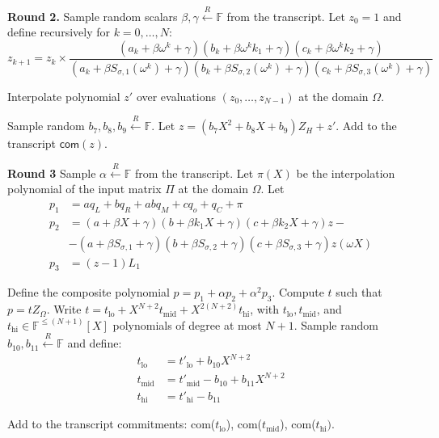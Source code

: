 \documentclass[../lecture-notes.tex]{subfiles}
\begin{document}
\textcolor{green!60!black}{\textbf{Round 2.}}  Sample random scalars $\beta,
\gamma \xleftarrow{R} \mathbb{F}$ from the transcript. Let $z_0 = 1$ and define
recursively for $k = 0, \dots, N$:
\begin{equation*}
    z_{k+1} = z_k \times \frac{(a_k + \beta \omega^{k} + \gamma) (b_k + \beta \omega^{k}k_1 + \gamma) (c_k + \beta \omega^{k}k_2 + \gamma)}{(a_k + \beta S_{\sigma,1}(\omega^{k}) + \gamma) (b_k + \beta S_{\sigma,2}(\omega^{k}) + \gamma) (c_k + \beta S_{\sigma,3}(\omega^{k}) + \gamma)}     
\end{equation*}

Interpolate polynomial $z'$ over evaluations $(z_0, \dots, z_{N-1})$ at the domain $\Omega$.

Sample random $b_7, b_8, b_9 \xleftarrow{R} \mathbb{F}$. Let $z = (b_7 X^2 + b_8
X + b_9)Z_H + z'$. Add to the transcript $\mathsf{com}(z)$.

\textcolor{green!60!black}{\textbf{Round 3}} Sample $\alpha \xleftarrow{R}
\mathbb{F}$ from the transcript. Let $\pi(X)$ be the interpolation polynomial of the
input matrix $\Pi$ at the domain $\Omega$. Let
\begin{align*}
p_1 &= aq_L + bq_R + abq_M + cq_o + q_C + \pi \\
p_2 &= (a + \beta X + \gamma)(b + \beta k_1 X + \gamma)(c + \beta k_2 X + \gamma)z - \\
    &- (a + \beta S_{\sigma,1} + \gamma)(b + \beta S_{\sigma,2} + \gamma)(c + \beta S_{\sigma,3} + \gamma)z(\omega X) \\
p_3 &= (z - 1)L_1
\end{align*}

Define the composite polynomial $p = p_1 + \alpha p_2 + \alpha^2 p_3$. Compute
$t$ such that $p = tZ_{\Omega}$. Write $t = t_{\text{lo}} +
X^{N+2}t_{\text{mid}} + X^{2(N+2)}t_{\text{hi}}$, with $t_{\text{lo}},
t_{\text{mid}}$, and $t_{\text{hi}} \in \mathbb{F}^{\leq (N+1)}[X]$ polynomials
of degree at most $N+1$. Sample random $b_{10}, b_{11} \xleftarrow{R} \mathbb{F}$ and define:
\begin{align*}
t_{\text{lo}} &= t'_{\text{lo}} + b_{10}X^{N+2} \\
t_{\text{mid}} &= t'_{\text{mid}} - b_{10} + b_{11}X^{N+2} \\
t_{\text{hi}} &= t'_{\text{hi}} - b_{11}
\end{align*}

Add to the transcript commitments: com($t_{\text{lo}}$), com($t_{\text{mid}}$), com($t_{\text{hi}})$.
\end{document}
